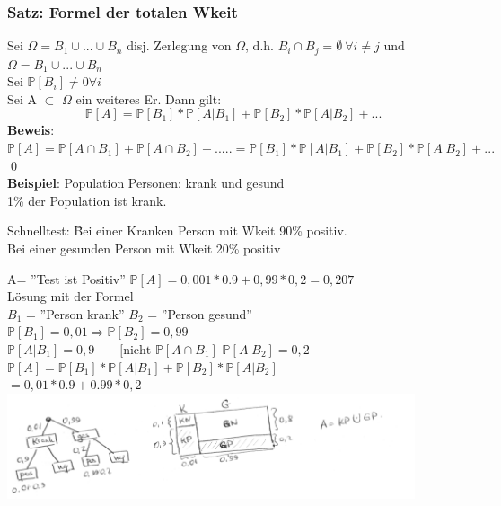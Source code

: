 \subsubsection{Satz: Formel der totalen Wkeit}
Sei $\Omega = B_1  \dot{\cup} ... \dot{\cup} B_n $ disj. Zerlegung von $\Omega$, d.h. $B_i \cap B_j = \emptyset \: \forall i \neq j$ und $\Omega = B_1 \cup ...\cup B_n$\\
Sei $\mathds{P}[B_i] \neq 0 \forall i$\medskip\\
Sei A $\subset$ $\Omega$ ein weiteres Er. Dann gilt: 
$$\mathds{P}[A] = \mathds{P}[B_1]*\mathds{P}[A \vert B_1] + \mathds{P}[B_2]*\mathds{P}[A\vert B_2]+...$$
\textbf{Beweis}: $\mathds{P}[A] = \mathds{P}[A\cap B_1]+\mathds{P}[A \cap B_2] +.....= \mathds{P}[B_1]*\mathds{P}[A \vert B_1] + \mathds{P}[B_2]*\mathds{P}[A\vert B_2]+... $\qed\medskip\\
\textbf{Beispiel}: Population Personen: krank und gesund\\
1\% der Population ist krank.\medskip\\
\begin{tabbing}
	Schnelltest: \= Bei einer Kranken Person mit Wkeit 90\% positiv.\\
	\> Bei einer gesunden Person mit Wkeit 20\% positiv
\end{tabbing}
A= ''Test ist Positiv''\hspace{1cm} $\mathds{P}[A]= 0,001*0.9+0,99*0,2 = 0,207$\smallskip\\
Lösung mit der Formel\\
$B_1 $ = ''Person krank'' \hspace{1cm} $B_2$ = ''Person gesund''\\
$ \mathds{P}[B_1]=0,01 \Rightarrow  \mathds{P}[B_2] =0,99$\smallskip\\
$\mathds{P}[A \vert B_1] = 0,9 \qquad [\text{nicht } \mathds{P}[A\cap B_1]$\smallskip
$\mathds{P}[A\vert B_2] = 0,2$\smallskip\\
$\mathds{P}[A] = \mathds{P}[B_1]*\mathds{P}[A\vert B_1] + \mathds{P}[B_2]*\mathds{P}[A\vert B_2]$\smallskip\\
$=0,01*0.9+0.99*0,2$\medskip\\
\includegraphics[width=0.9\textwidth]{img/baum.PNG}\\
